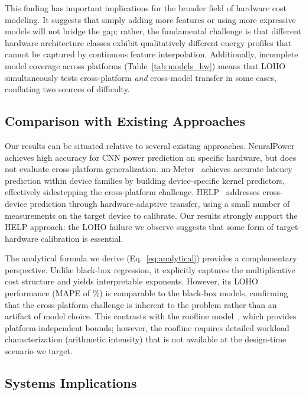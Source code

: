 \documentclass[preprint,review,12pt]{elsarticle}
\begin{document}
This finding has important implications for the broader field of hardware cost modeling.
It suggests that simply adding more features or using more expressive models will not bridge the gap; rather, the fundamental challenge is that different hardware architecture classes exhibit qualitatively different energy profiles that cannot be captured by continuous feature interpolation.
Additionally, incomplete model coverage across platforms (Table~\ref{tab:models_hw}) means that LOHO simultaneously tests cross-platform \emph{and} cross-model transfer in some cases, conflating two sources of difficulty.

\subsection{Comparison with Existing Approaches}
\label{sec:discussion_comparison}

Our results can be situated relative to several existing approaches.
NeuralPower~\cite{cai2017neuralpower} achieves high accuracy for CNN power prediction on specific hardware, but does not evaluate cross-platform generalization.
nn-Meter~\cite{zhang2021nnmeter} achieves accurate latency prediction within device families by building device-specific kernel predictors, effectively sidestepping the cross-platform challenge.
HELP~\cite{lee2021help} addresses cross-device prediction through hardware-adaptive transfer, using a small number of measurements on the target device to calibrate.
Our results strongly support the HELP approach: the LOHO failure we observe suggests that some form of target-hardware calibration is essential.

The analytical formula we derive (Eq.~\ref{eq:analytical}) provides a complementary perspective.
Unlike black-box regression, it explicitly captures the multiplicative cost structure and yields interpretable exponents.
However, its LOHO performance (MAPE of \unskip\%) is comparable to the black-box models, confirming that the cross-platform challenge is inherent to the problem rather than an artifact of model choice.
This contrasts with the roofline model~\cite{williams2009roofline}, which provides platform-independent bounds; however, the roofline requires detailed workload characterization (arithmetic intensity) that is not available at the design-time scenario we target.

\subsection{Systems Implications}
\label{sec:discussion_systems}
\end{document}

